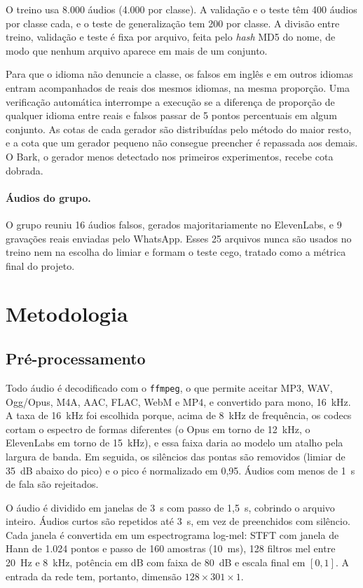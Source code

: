 O treino usa 8.000 áudios (4.000 por classe). A validação e o teste têm 400 áudios por classe cada, e o teste de generalização tem 200 por classe. A divisão entre treino, validação e teste é fixa por arquivo, feita pelo \textit{hash} MD5 do nome, de modo que nenhum arquivo aparece em mais de um conjunto.

Para que o idioma não denuncie a classe, os falsos em inglês e em outros idiomas entram acompanhados de reais dos mesmos idiomas, na mesma proporção. Uma verificação automática interrompe a execução se a diferença de proporção de qualquer idioma entre reais e falsos passar de 5 pontos percentuais em algum conjunto. As cotas de cada gerador são distribuídas pelo método do maior resto, e a cota que um gerador pequeno não consegue preencher é repassada aos demais. O Bark, o gerador menos detectado nos primeiros experimentos, recebe cota dobrada.

\paragraph{Áudios do grupo.} O grupo reuniu 16 áudios falsos, gerados majoritariamente no ElevenLabs, e 9 gravações reais enviadas pelo WhatsApp. Esses 25 arquivos nunca são usados no treino nem na escolha do limiar e formam o teste cego, tratado como a métrica final do projeto.


\section{Metodologia}
\label{sec:metodo}

\subsection{Pré-processamento}

Todo áudio é decodificado com o \texttt{ffmpeg}, o que permite aceitar MP3, WAV, Ogg/Opus, M4A, AAC, FLAC, WebM e MP4, e convertido para mono, 16~kHz. A taxa de 16~kHz foi escolhida porque, acima de 8~kHz de frequência, os codecs cortam o espectro de formas diferentes (o Opus em torno de 12~kHz, o ElevenLabs em torno de 15~kHz), e essa faixa daria ao modelo um atalho pela largura de banda. Em seguida, os silêncios das pontas são removidos (limiar de 35~dB abaixo do pico) e o pico é normalizado em 0,95. Áudios com menos de 1~s de fala são rejeitados.

O áudio é dividido em janelas de 3~s com passo de 1,5~s, cobrindo o arquivo inteiro. Áudios curtos são repetidos até 3~s, em vez de preenchidos com silêncio. Cada janela é convertida em um espectrograma log-mel: STFT com janela de Hann de 1.024 pontos e passo de 160 amostras (10~ms), 128 filtros mel entre 20~Hz e 8~kHz, potência em dB com faixa de 80~dB e escala final em $[0,1]$. A entrada da rede tem, portanto, dimensão $128 \times 301 \times 1$.

